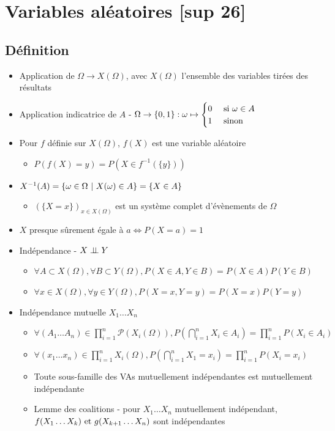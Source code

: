 \documentclass[openany]{book}
\begin{document}
\clearpage
\section{Variables aléatoires [sup 26]}
\subsection{Définition}
\begin{itemize}
    \item Application de $\Omega \rightarrow X(\Omega)$, avec $X(\Omega)$ l'ensemble des variables tirées des résultats
    \item Application indicatrice de $A$ - $\Omega \rightarrow \{0, 1\} : \omega \mapsto \begin{cases}
        0 & \text{ si } \omega \in A \\
        1 & \text{ sinon}
    \end{cases}$
    \item Pour $f$ définie sur $X(\Omega)$, $f(X)$ est une variable aléatoire
    \begin{itemize}
        \item $P(f(X) = y) = P(X \in f^{-1}(\{y\}))$
    \end{itemize}
    \item $X^{-1}(A) = \{ \omega \in \Omega \text{ } | \text{ } X(\omega) \in A\} = \{ X \in A\}$
    \begin{itemize}
        \item $(\{X = x\})_{x \in X(\Omega)}$ est un système complet d'évènements de $\Omega$
    \end{itemize}
    \item $X$ presque sûrement égale à $a \iff P(X=a) = 1$
    \item Indépendance - $X \perp\!\!\!\perp Y$
    \begin{itemize}
        \item $\forall A \subset X(\Omega), \forall B \subset Y(\Omega), P(X \in A, Y \in B) = P(X \in A)P(Y \in B) $
        \item $\forall x \in X(\Omega), \forall y \in Y(\Omega), P(X = x, Y = y) = P(X = x)P(Y = y)$
    \end{itemize} 
    \item Indépendance mutuelle $X_1 \dots X_n$
    \begin{itemize}
        \item $ \forall (A_1 \dots A_n)\! \in \prod_{i=1}^{n} \mathcal{P}(X_i(\Omega)), P(\bigcap_{i=1}^n X_i \in A_i) = \prod_{i=1}^{n}P(X_i \in A_i) $
        \item $ \forall (x_1 \dots x_n) \in \prod_{i=1}^{n} X_i(\Omega), P(\bigcap_{i=1}^n X_1 =x_i) = \prod_{i=1}^{n}P(X_i = x_i) $
        \item Toute sous-famille des VAs mutuellement indépendantes est mutuellement indépendante
        \item Lemme des coalitions - pour $X_1 \dots X_n$ mutuellement indépendant, $f(X_1\dots X_k) \text{ et } g(X_{k+1}\dots X_n)$ sont indépendantes
    \end{itemize}
\end{itemize}
\end{document}
